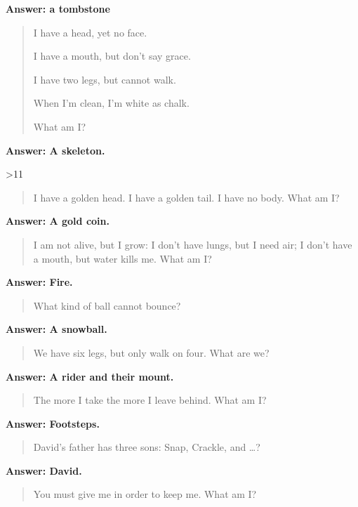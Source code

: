 \begin{multicols}{2}
	\textbf{Answer: a tombstone}

	\begin{quotation}
		I have a head, yet no face.

		I have a mouth, but don't say grace.

		I have two legs, but cannot walk.

		When I'm clean, I'm white as chalk.

		What am I?
	\end{quotation}

	\textbf{Answer: A skeleton.}
\fi

\ifnum\month>11

\begin{quotation}
I have a golden head. I have a golden tail. I have no body.
What am I?
\end{quotation}

\textbf{Answer: A gold coin.}


\begin{quotation}
I am not alive, but I grow: I don't have lungs, but I need air; I don't have a mouth, but water kills me.
What am I?
\end{quotation}

\textbf{Answer: Fire.}

\begin{quotation}
What kind of ball cannot bounce?
\end{quotation}

\textbf{Answer: A snowball.}

\fi

\begin{quotation}

	We have six legs, but only walk on four.
	What are we?

\end{quotation}

\textbf{Answer: A rider and their mount.}


\begin{quotation}
	The more I take the more I leave behind.
	What am I?
\end{quotation}

\textbf{Answer: Footsteps.}

\begin{quotation}
	David's father has three sons: Snap, Crackle, and  \ldots?
\end{quotation}

\textbf{Answer: David.}

\begin{quotation}
You must give me in order to keep me.
What am I? 
\end{quotation}


\end{multicols}
